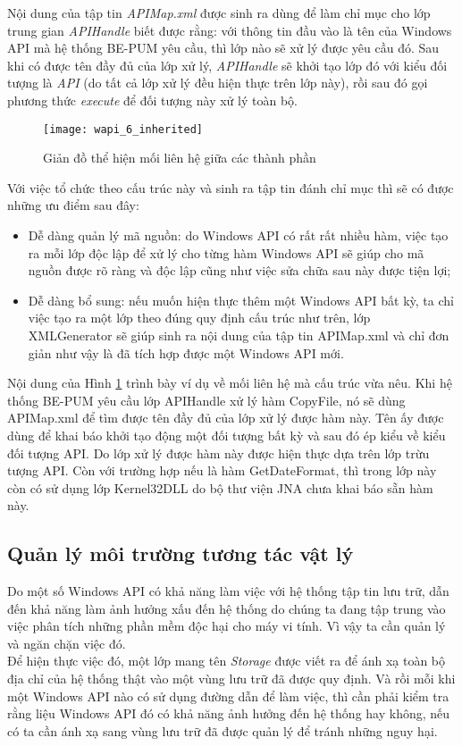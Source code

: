 Nội dung của tập tin \textit{APIMap.xml} được sinh ra dùng để làm chỉ mục cho lớp trung gian \textit{APIHandle} biết được rằng: với thông tin đầu vào là tên của Windows API mà hệ thống BE-PUM yêu cầu, thì lớp nào sẽ xử lý được yêu cầu đó. Sau khi có được tên đầy đủ của lớp xử lý, \textit{APIHandle} sẽ khởi tạo lớp đó với kiểu đối tượng là \textit{API} (do tất cả lớp xử lý đều hiện thực trên lớp này), rồi sau đó gọi phương thức \textit{execute} để đối tượng này xử lý toàn bộ.

	\begin{figure}[H]
	\centering
		\texttt{[image: wapi\_6\_inherited]}
		\caption{Giản đồ thể hiện mối liên hệ giữa các thành phần}	
		\label{fig:wapi_6_inherited}		
	\end{figure}


Với việc tổ chức theo cấu trúc này và sinh ra tập tin đánh chỉ mục thì sẽ có được những ưu điểm sau đây:

\begin{itemize}
	\item Dễ dàng quản lý mã nguồn: do Windows API có rất rất nhiều hàm, việc tạo ra mỗi lớp độc lập để xử lý cho từng hàm Windows API sẽ giúp cho mã nguồn được rõ ràng và độc lập cũng như việc sửa chữa sau này được tiện lợi;

	\item Dễ dàng bổ sung: nếu muốn hiện thực thêm một Windows API bất kỳ, ta chỉ việc tạo ra một lớp theo đúng quy định cấu trúc như trên, lớp XMLGenerator sẽ giúp sinh ra nội dung của tập tin APIMap.xml và chỉ đơn giản như vậy là đã tích hợp được một Windows API mới.
\end{itemize}

Nội dung của Hình \ref{fig:wapi_6_inherited} trình bày ví dụ về mối liên hệ mà cấu trúc vừa nêu. Khi hệ thống BE-PUM yêu cầu lớp APIHandle xử lý hàm CopyFile, nó sẽ dùng APIMap.xml để tìm được tên đầy đủ của lớp xử lý được hàm này. Tên ấy được dùng để khai báo khởi tạo động một đối tượng bất kỳ và sau đó ép kiểu về kiểu đối tượng API. Do lớp xử lý được hàm này được hiện thực dựa trên lớp trừu tượng API. Còn với trường hợp nếu là hàm GetDateFormat, thì trong lớp này còn có sử dụng lớp Kernel32DLL do bộ thư viện JNA chưa khai báo sẵn hàm này.

	\subsection{Quản lý môi trường tương tác vật lý}

Do một số Windows API có khả năng làm việc với hệ thống tập tin lưu trữ, dẫn đến khả năng làm ảnh hưởng xấu đến hệ thống do chúng ta đang tập trung vào việc phân tích những phần mềm độc hại cho máy vi tính. Vì vậy ta cần quản lý và ngăn chặn việc đó.\\

Để hiện thực việc đó, một lớp mang tên \textit{Storage} được viết ra để ánh xạ toàn bộ địa chỉ của hệ thống thật vào một vùng lưu trữ đã được quy định. Và rồi mỗi khi một Windows API nào có sử dụng đường dẫn để làm việc, thì cần phải kiểm tra rằng liệu Windows API đó có khả năng ảnh hưởng đến hệ thống hay không, nếu có ta cần ánh xạ sang vùng lưu trữ đã được quản lý để tránh những nguy hại.
